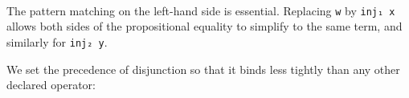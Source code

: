 \begin{fence}
\begin{code}%
\>[0]\AgdaSpace{}%
\AgdaSymbol{:}\AgdaSpace{}%
\AgdaSpace{}%
\AgdaSymbol{\{}\AgdaSpace{}%
\AgdaSpace{}%
\AgdaSpace{}%
\AgdaSymbol{:}\AgdaSpace{}%
\AgdaSymbol{\}}\AgdaSpace{}%
\AgdaSymbol{(}\AgdaSpace{}%
\AgdaSymbol{:}\AgdaSpace{}%
\AgdaSpace{}%
\AgdaSpace{}%
\AgdaSpace{}%
\AgdaSpace{}%
\AgdaSymbol{)}\AgdaSpace{}%
\AgdaSymbol{(}\AgdaSpace{}%
\AgdaSymbol{:}\AgdaSpace{}%
\AgdaSpace{}%
\AgdaSpace{}%
\AgdaSymbol{)}\AgdaSpace{}%
\<%
\\
\>[0][@{}l@{\AgdaIndent{0}}]%
\>[2]\AgdaSpace{}%
\AgdaSymbol{(}\AgdaSpace{}%
\AgdaSpace{}%
\AgdaSymbol{)}\AgdaSpace{}%
\AgdaSymbol{(}\AgdaSpace{}%
\AgdaSpace{}%
\AgdaSymbol{)}\AgdaSpace{}%
\AgdaSpace{}%
\AgdaSpace{}%
\AgdaSpace{}%
\<%
\\
\>[0]\AgdaSpace{}%
\AgdaSpace{}%
\AgdaSymbol{(}\AgdaSpace{}%
\AgdaSymbol{)}\AgdaSpace{}%
\AgdaSymbol{=}\AgdaSpace{}%
\<%
\\
\>[0]\AgdaSpace{}%
\AgdaSpace{}%
\AgdaSymbol{(}\AgdaSpace{}%
\AgdaSymbol{)}\AgdaSpace{}%
\AgdaSymbol{=}\AgdaSpace{}%
\<%
\end{code}
\end{fence}

The pattern matching on the left-hand side is essential. Replacing
\texttt{w} by \texttt{inj₁\ x} allows both sides of the propositional
equality to simplify to the same term, and similarly for
\texttt{inj₂\ y}.

We set the precedence of disjunction so that it binds less tightly than
any other declared operator:

\begin{fence}
\begin{code}%
\>[0]\AgdaSpace{}%
\AgdaSpace{}%
\<%
\end{code}
\end{fence}


